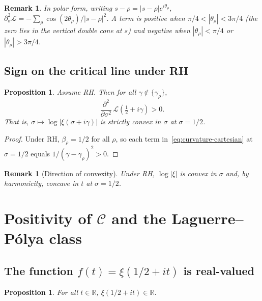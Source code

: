 \documentclass[11pt]{amsart}
\newtheorem{proposition}[theorem]{Proposition}
\newtheorem{remark}[theorem]{Remark}
\begin{document}
\begin{remark}
In polar form, writing $s - \rho = |s-\rho|e^{i\theta_\rho}$,
$\partial^2_{\sigma}\mathcal{L} = -\sum_\rho \cos(2\theta_\rho)/|s-\rho|^2$.
A term is positive when $\pi/4<|\theta_\rho|<3\pi/4$ (the zero lies in the vertical double
cone at $s$) and negative when $|\theta_\rho|<\pi/4$ or $|\theta_\rho|>3\pi/4$.
\end{remark}

\subsection{Sign on the critical line under RH}

\begin{proposition}\label{prop:sigma-convex}
Assume RH. Then for all $\gamma \notin \{\gamma_\rho\}$,
\[
  \frac{\partial^2}{\partial\sigma^2}\,\mathcal{L}\!\left(\tfrac{1}{2}+i\gamma\right) > 0.
\]
That is, $\sigma \mapsto \log|\xi(\sigma+i\gamma)|$ is strictly convex in $\sigma$
at $\sigma = 1/2$.
\end{proposition}

\begin{proof}
Under RH, $\beta_\rho = 1/2$ for all $\rho$, so each term in~\eqref{eq:curvature-cartesian}
at $\sigma=1/2$ equals $1/(\gamma-\gamma_\rho)^2 > 0$.
\end{proof}

\begin{remark}[Direction of convexity]
Under RH, $\log|\xi|$ is convex in $\sigma$ and, by harmonicity, concave in $t$ at
$\sigma = 1/2$.
\end{remark}

\section{Positivity of \texorpdfstring{$\mathcal C$}{C} and the Laguerre--P\'olya class}
\label{sec:lp}

\subsection{The function \texorpdfstring{$f(t) = \xi(1/2+it)$}{f(t)=xi(1/2+it)} is real-valued}

\begin{proposition}\label{prop:real}
For all $t \in \mathbb{R}$, $\xi(1/2+it) \in \mathbb{R}$.
\end{proposition}
\end{document}
